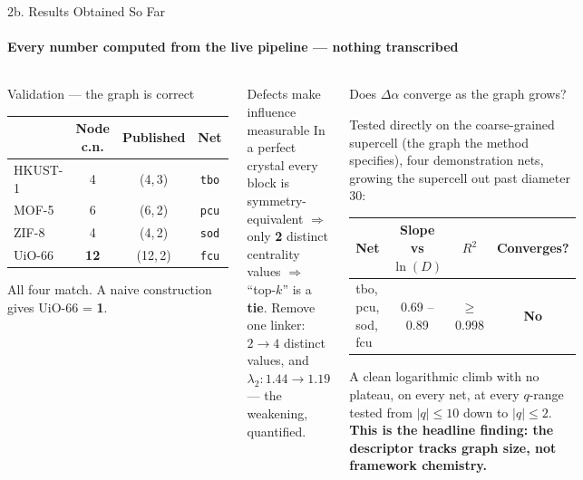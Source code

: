 \documentclass[aspectratio=169, 11pt]{beamer}
\begin{document}
\begin{frame}{2b. Results Obtained So Far}
\framesubtitle{Every number computed from the live pipeline --- nothing transcribed}
\begin{columns}[T]
\begin{block}{\footnotesize Validation --- the graph is correct}
{\scriptsize
\begin{tabular}{@{}lccc@{}}
\toprule
& \textbf{Node c.n.} & \textbf{Published} & \textbf{Net} \\
\midrule
HKUST-1 & 4 & (4,\,3) & \texttt{tbo} \\
MOF-5 & 6 & (6,\,2) & \texttt{pcu} \\
ZIF-8 & 4 & (4,\,2) & \texttt{sod} \\
UiO-66 & \textbf{12} & (12,\,2) & \texttt{fcu} \\
\bottomrule
\end{tabular}
\vspace{0.1cm}

All four match. A naive construction gives UiO-66 = \textbf{1}.}
\end{block}

\begin{block}{\footnotesize Defects make influence measurable}
{\scriptsize
In a perfect crystal every block is symmetry-equivalent $\Rightarrow$ only \textbf{2}
distinct centrality values $\Rightarrow$ ``top-$k$'' is a \textbf{tie}.
Remove one linker: $2 \to 4$ distinct values, and
$\lambda_2: 1.44 \to 1.19$ --- the weakening, quantified.}
\end{block}

\begin{block}{\footnotesize Does $\Delta\alpha$ converge as the graph grows?}
{\scriptsize
Tested directly on the coarse-grained supercell (the graph the method specifies), four
demonstration nets, growing the supercell out past diameter 30:
\begin{tabular}{@{}lccc@{}}
\toprule
Net & Slope vs $\ln(D)$ & $R^2$ & Converges? \\
\midrule
tbo, pcu, sod, fcu & 0.69 -- 0.89 & $\geq$0.998 & \textcolor{warnRed}{\textbf{No}} \\
\bottomrule
\end{tabular}
\vspace{0.08cm}

A clean logarithmic climb with no plateau, on every net, at every $q$-range tested from
$|q|\leq10$ down to $|q|\leq2$. \textbf{This is the headline finding: the descriptor tracks
graph size, not framework chemistry.}}
\end{block}


\end{columns}
\end{frame}
\end{document}
